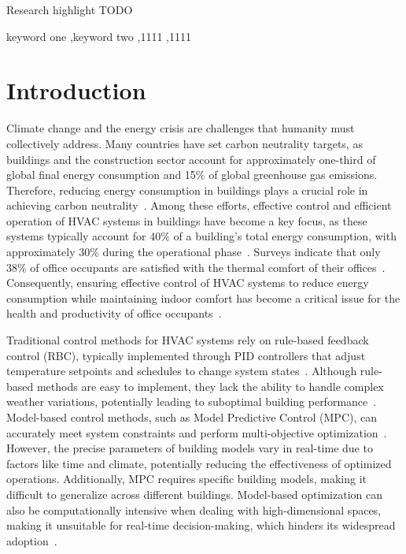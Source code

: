 \documentclass[preprint,12pt]{elsarticle}
\begin{document}
\begin{frontmatter}
\begin{highlights}
\item Research highlight TODO
\end{highlights}

\begin{keyword}
keyword one \sep keyword two
 \sep 1111
 \sep 1111
\end{keyword}

\end{frontmatter}


\section{Introduction}
Climate change and the energy crisis are challenges that humanity must collectively address.
Many countries have set carbon neutrality targets, as buildings and the construction sector 
account for approximately one-third of global final energy consumption and 15\% of global 
greenhouse gas emissions. Therefore, reducing energy consumption in buildings plays a crucial 
role in achieving carbon neutrality~\cite{ref1}. Among these efforts, effective control and 
efficient operation of HVAC systems in buildings have become a key focus, as these systems 
typically account for 40\% of a building's total energy consumption, with approximately 30\% during 
the operational phase~\cite{ref2, ref3}. Surveys indicate that only 38\% of office occupants are 
satisfied with the thermal comfort of their offices~\cite{ref3}. Consequently, ensuring effective 
control of HVAC systems to reduce energy consumption while maintaining indoor comfort has become a 
critical issue for the health and productivity of office occupants~\cite{ref4, ref7}.

Traditional control methods for HVAC systems rely on rule-based feedback control (RBC), typically 
implemented through PID controllers that adjust temperature setpoints and schedules to change system 
states~\cite{ref5}. Although rule-based methods are easy to implement, they lack the ability to handle 
complex weather variations, potentially leading to suboptimal building performance~\cite{ref6}. 
Model-based control methods, such as Model Predictive Control (MPC), can accurately meet system 
constraints and perform multi-objective optimization~\cite{ref7, ref8}. However, the precise parameters 
of building models vary in real-time due to factors like time and climate, potentially reducing the 
effectiveness of optimized operations. Additionally, MPC requires specific building models, making it 
difficult to generalize across different buildings. Model-based optimization can also be computationally 
intensive when dealing with high-dimensional spaces, making it unsuitable for real-time decision-making, 
which hinders its widespread adoption~\cite{ref9}.
\end{document}
